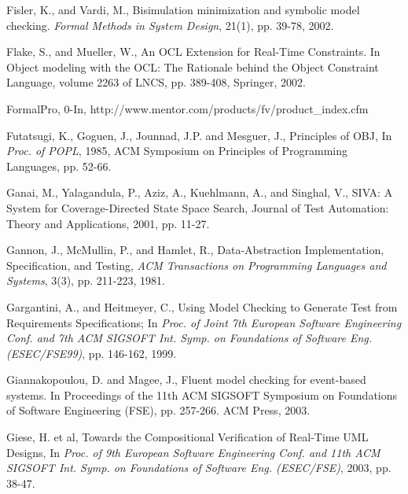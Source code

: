 {\begin{thebibliography}{99}
 Fisler, K., and Vardi, M., Bisimulation minimization and
	symbolic model checking. {\em Formal Methods in System Design},
	21(1), pp. 39-78, 2002.

 Flake, S., and Mueller, W., An OCL Extension for
    Real-Time Constraints. In Object modeling with the OCL:
    The Rationale behind the Object Constraint Language,
    volume 2263 of LNCS, pp. 389-408, Springer, 2002. 

 FormalPro, 0-In, 
        http://www.mentor.com/products/fv/product\_index.cfm

 Futatsugi, K., Goguen, J., Jounnad, J.P. and 
	Mesguer, J., Principles of OBJ, In {\em Proc. of POPL}, 1985, 
	ACM Symposium on Principles of Programming Languages, pp. 52-66.


 Ganai, M., Yalagandula, P., Aziz, A., Kuehlmann, A., 
	and Singhal, V., SIVA: A System for Coverage-Directed State 
	Space Search, Journal of Test Automation: Theory and Applications, 
	2001, pp. 11-27. 

 Gannon, J., McMullin, P., and Hamlet, R., 
	Data-Abstraction Implementation, Specification, and Testing, {\em ACM 
	Transactions on Programming Languages and Systems}, 3(3), 
	pp. 211-223, 1981.

 Gargantini, A., and Heitmeyer, C., Using Model 
	Checking to Generate Test from Requirements Specifications; In 
	{\em Proc. of Joint 7th European Software Engineering
        Conf. and 7th ACM SIGSOFT Int. Symp. on Foundations
        of Software Eng. (ESEC/FSE99)}, pp. 146-162, 1999.


 Giannakopoulou, D. and Magee, J., Fluent model checking for
    event-based systems. In Proceedings of the 11th ACM
    SIGSOFT Symposium on Foundations of Software Engineering
    (FSE), pp. 257-266. ACM Press, 2003.

 Giese, H. et al,
    Towards the Compositional Verification of Real-Time UML Designs,
    In {\em Proc. of 9th European Software Engineering
    Conf. and 11th ACM SIGSOFT Int. Symp. on Foundations
    of Software Eng. (ESEC/FSE)}, 2003, pp. 38-47.


\end{thebibliography}}
